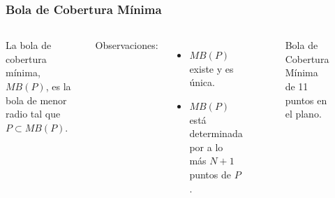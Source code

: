 \documentclass{beamer}
\begin{document}
\begin{frame}\frametitle{Bola de Cobertura Mínima}

\begin{columns}
  \begin{Definicion}
  La bola de cobertura mínima, \(MB(P)\), 
  es la bola de menor radio tal que \(P\subset MB(P)\).
  \end{Definicion}

  Observaciones:
  \begin{itemize}
    \item \(MB(P)\) existe y es única.
    \item \(MB(P)\) está determinada por a lo más \(N+1\) puntos de \(P\).  
  \end{itemize}

  \begin{figure}[H]
    \centering
    \caption{Bola de Cobertura Mínima de 11 puntos en el plano.}
  \end{figure}
\end{columns}
\end{frame}
\end{document}
